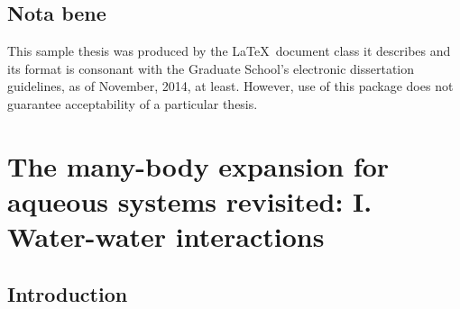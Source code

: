 \documentclass [11pt, proquest] {uwthesis}[2020/02/24]
\begin{document}
 
\section{Nota bene}
 
This sample thesis was produced by the \LaTeX\ document class it describes
and its format is consonant with the Graduate School's electronic dissertation guidelines,
as of November, 2014, at least.
However, use of this package does not guarantee acceptability
of a particular thesis.
 
 
\chapter{The many-body expansion for aqueous systems revisited: I. Water-water interactions}

\section{Introduction}
\end{document}
